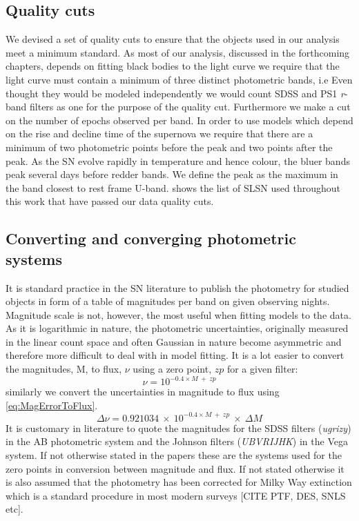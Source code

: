 \subsection{Quality cuts}
We devised a set of quality cuts to ensure that the objects used in our analysis meet a minimum standard. As most of our analysis, discussed in the forthcoming chapters, depends on fitting black bodies to the light curve we require that the light curve must contain a minimum of three distinct photometric bands, i.e Even thought they would be modeled independently we would count SDSS and PS1 \textit{r}-band filters as one for the purpose of the quality cut. Furthermore we make a cut on the number of epochs observed per band. In order to use models which depend on the rise and decline time of the supernova we require that there are a minimum of two photometric points before the peak and two points after the peak. As the SN evolve rapidly in temperature and hence colour, the bluer bands peak several days before redder bands. We define the peak as the maximum in the band closest to rest frame U-band.  shows the list of SLSN used throughout this work that have passed our data quality cuts.

\subsection{Converting and converging photometric systems}
It is standard practice in the SN literature to publish the photometry for studied objects in form of a table of magnitudes per band on given observing nights. Magnitude scale is not, however, the most useful when fitting models to the data. As it is logarithmic in nature, the photometric uncertainties, originally measured in the linear count space and often Gaussian in nature become asymmetric and therefore more difficult to deal with in model fitting. It is a lot easier to convert the magnitudes, M, to flux, $\nu$ using a zero point, $zp$ for a given filter:
\begin{equation}
\label{eq:MagToFlux}
\nu = 10^{-0.4 \times M~+~zp}
\end{equation}
similarly we convert the uncertainties in magnitude to flux using \eqref{eq:MagErrorToFlux}.
\begin{equation}
\label{eq:MagErrorToFlux}
\Delta \nu = 0.921034~\times~10^{-0.4 \times M~+~zp}~\times~\Delta M
\end{equation}
It is customary in literature to quote the magnitudes for the SDSS filters (\textit{ugrizy}) in the AB photometric system and the Johnson filters (\textit{UBVRIJHK}) in the Vega system. If not otherwise stated in the papers these are the systems used for the zero points in conversion between magnitude and flux. If not stated otherwise it is also assumed that the photometry has been corrected for Milky Way extinction which is a standard procedure in most modern surveys [CITE PTF, DES, SNLS etc].

